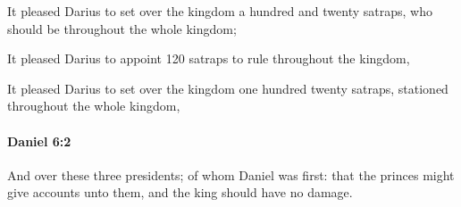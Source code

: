			\begin{versebox}
					\item[BHS] 
					\item[LXX] 
					\item[ASV] It pleased Darius to set over the kingdom a hundred and twenty satraps, who should be throughout the whole kingdom;
					\item[NIV] It pleased Darius to appoint 120 satraps to rule throughout the kingdom,
					\item[NRSV] It pleased Darius to set over the kingdom one hundred twenty satraps, stationed throughout the whole kingdom,
			\end{versebox}

		\paragraph{Daniel 6:2} %
			\label{DANIEL-6-2}

			And over these three presidents; of whom Daniel was first: that the princes might give accounts unto them, and the king should have no damage.

